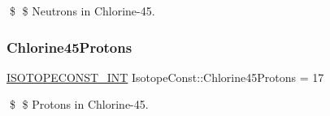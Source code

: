 \$ \$ Neutrons in Chlorine-\/45. \mbox{\label{group___isotope_const-_chlorine-_cl45_ga7e7210564c1404ae3fba0f07f981db4f}} 
\subsubsection{\texorpdfstring{Chlorine45\+Protons}{Chlorine45Protons}}
{\footnotesize\ttfamily \mbox{\hyperlink{group___isotope_const-_macros_ga5f18360b3e99483a35c32d789e62621c}{I\+S\+O\+T\+O\+P\+E\+C\+O\+N\+S\+T\+\_\+\+I\+NT}} Isotope\+Const\+::\+Chlorine45\+Protons = 17}

\$ \$ Protons in Chlorine-\/45. 